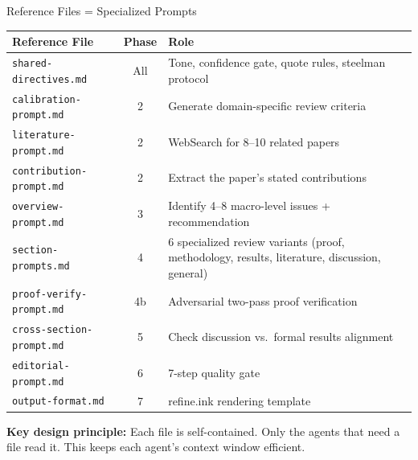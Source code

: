 \documentclass[10pt,english,aspectratio=169]{beamer}
\begin{document}
\begin{frame}{Reference Files = Specialized Prompts}

\begin{small}
\begin{tabular}{lcp{7.5cm}}
\toprule
\textbf{Reference File} & \textbf{Phase} & \textbf{Role} \\
\midrule
\texttt{shared-directives.md} & All & Tone, confidence gate, quote rules, steelman protocol \\
\texttt{calibration-prompt.md} & 2 & Generate domain-specific review criteria \\
\texttt{literature-prompt.md} & 2 & WebSearch for 8--10 related papers \\
\texttt{contribution-prompt.md} & 2 & Extract the paper's stated contributions \\
\texttt{overview-prompt.md} & 3 & Identify 4--8 macro-level issues + recommendation \\
\texttt{section-prompts.md} & 4 & 6 specialized review variants (proof, methodology, results, literature, discussion, general) \\
\texttt{proof-verify-prompt.md} & 4b & Adversarial two-pass proof verification \\
\texttt{cross-section-prompt.md} & 5 & Check discussion vs.\ formal results alignment \\
\texttt{editorial-prompt.md} & 6 & 7-step quality gate \\
\texttt{output-format.md} & 7 & refine.ink rendering template \\
\bottomrule
\end{tabular}
\end{small}

\vspace{0.3cm}
\textbf{Key design principle:} Each file is self-contained. Only the agents that need a file read it. This keeps each agent's context window efficient.

\end{frame}
\end{document}
